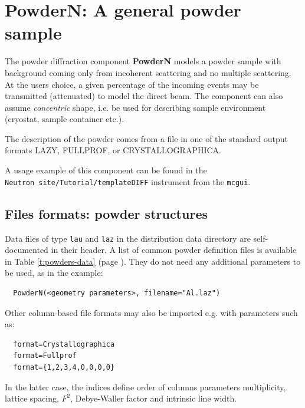 \section{PowderN: A general powder sample}
\label{powder}


The powder diffraction component \textbf{PowderN} models a powder sample
with background coming only from incoherent scattering and no
multiple scattering. At the users choice, a given percentage of the incoming
events may be transmitted (attenuated) to model the direct beam. The component can also
assume \emph{concentric} shape, i.e. be used for describing sample environment (cryostat,
sample container etc.). 

The description of the powder comes from a file in one of the standard output formats LAZY, FULLPROF, or CRYSTALLOGRAPHICA.

A usage example of this component can be found in the \\
\verb+Neutron site/Tutorial/templateDIFF+ instrument from the \verb+mcgui+.

\subsection{Files formats: powder structures}

Data files of type \verb'lau' and \verb'laz' in the \MCS distribution data directory are self-documented in their header. A list of common powder definition files is available in Table \ref{t:powders-data} (page \pageref{t:powders-data}). They do not need any additional parameters to be used, as in the example:
\begin{lstlisting}
  PowderN(<geometry parameters>, filename="Al.laz")
\end{lstlisting}
Other column-based file formats may also be imported e.g. with parameters such as:
\begin{lstlisting}
  format=Crystallographica
  format=Fullprof
  format={1,2,3,4,0,0,0,0}
\end{lstlisting}
In the latter case, the indices define order of columns parameters
multiplicity, lattice spacing, $F^2$, Debye-Waller factor and intrinsic line width.

